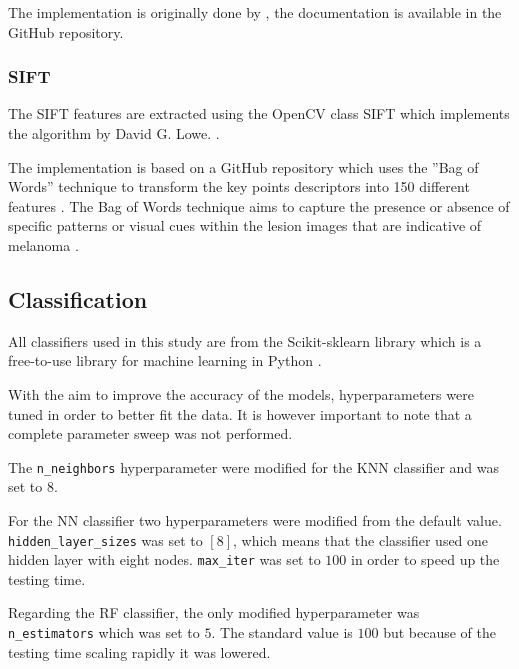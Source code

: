 \documentclass{kththesis}
\begin{document}
\newpage

The implementation is originally done by \parencite{melanoma-classifier}, the documentation is available in the GitHub repository.



\subsubsection{SIFT}

The SIFT features are extracted using the OpenCV class SIFT which implements the algorithm by David G. Lowe. \parencite{sift-opencv} \parencite{lowe2004distinctive}.

The implementation is based on a GitHub repository which uses the ''Bag of Words'' technique to transform the key points descriptors into 150 different features \parencite{SIFT-repo}. The Bag of Words technique aims to capture the presence or absence of specific patterns or visual cues within the lesion images that are indicative of melanoma \parencite{9960177}.


\subsection{Classification}

All classifiers used in this study are from the Scikit-sklearn library which is a free-to-use library for machine learning in Python \parencite{scikit-learn-doc}.

With the aim to improve the accuracy of the models, hyperparameters were tuned in order to better fit the data. It is however important to note that a complete parameter sweep was not performed.

The \verb|n_neighbors| hyperparameter were modified for the KNN classifier and was set to $8$.

For the NN classifier two hyperparameters were modified from the default value. \verb|hidden_layer_sizes| was set to $[8]$, which means that the classifier used one hidden layer with eight nodes. \verb|max_iter| was set to $100$ in order to speed up the testing time.

Regarding the RF classifier, the only modified hyperparameter was \\ \verb|n_estimators| which was set to $5$. The standard value is $100$ but because of the testing time scaling rapidly it was lowered.
\end{document}
